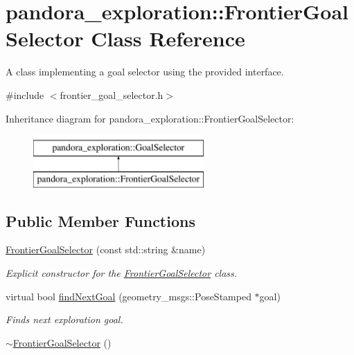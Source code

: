 \hypertarget{classpandora__exploration_1_1_frontier_goal_selector}{\section{pandora\-\_\-exploration\-:\-:\-Frontier\-Goal\-Selector \-Class \-Reference}
\label{classpandora__exploration_1_1_frontier_goal_selector}
}


\-A class implementing a goal selector using the provided interface.  




{\ttfamily \#include $<$frontier\-\_\-goal\-\_\-selector.\-h$>$}

\-Inheritance diagram for pandora\-\_\-exploration\-:\-:\-Frontier\-Goal\-Selector\-:\begin{figure}[H]
\begin{center}
\leavevmode
\includegraphics[height=2.000000cm]{classpandora__exploration_1_1_frontier_goal_selector}
\end{center}
\end{figure}
\subsection*{\-Public \-Member \-Functions}
\begin{DoxyCompactItemize}
\item 
\hyperlink{classpandora__exploration_1_1_frontier_goal_selector_a8da4904b3acb5d0a7fcee77b56a85f0d}{\-Frontier\-Goal\-Selector} (const std\-::string \&name)
\begin{DoxyCompactList}\small\item\em \-Explicit constructor for the \hyperlink{classpandora__exploration_1_1_frontier_goal_selector}{\-Frontier\-Goal\-Selector} class. \end{DoxyCompactList}\item 
virtual bool \hyperlink{classpandora__exploration_1_1_frontier_goal_selector_a9d623b7ca8901ecb569f052381ee3fcc}{find\-Next\-Goal} (geometry\-\_\-msgs\-::\-Pose\-Stamped $\ast$goal)
\begin{DoxyCompactList}\small\item\em \-Finds next exploration goal. \end{DoxyCompactList}\item 
\hyperlink{classpandora__exploration_1_1_frontier_goal_selector_a5453c390d3389c1481dcf4a59e046ee1}{$\sim$\-Frontier\-Goal\-Selector} ()
\end{DoxyCompactItemize}


